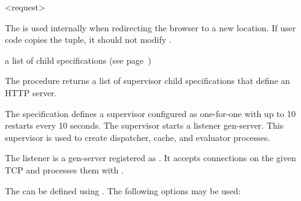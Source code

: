 \begin{tupledef}{<request>}
\end{tupledef}

The  is used internally when redirecting the
browser to a new location. If user code copies the 
tuple, it should not modify .

\begin{procedure}
\end{procedure}
\returns{} a list of child specifications (see page~\pageref{page:child-spec})

\begin{argtbl}
\end{argtbl}

The  procedure returns a list of
supervisor child specifications that define an HTTP server.

The specification defines a supervisor configured as one-for-one with
up to 10 restarts every 10 seconds. The supervisor starts a listener
gen-server. This supervisor is used to create dispatcher, cache,
and evaluator processes.

The listener is a gen-server registered as . It accepts
connections on the given TCP  and processes them with
.

The  can be defined using . The following options may be
used:

